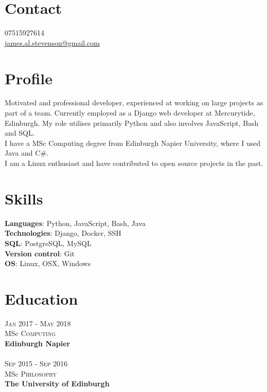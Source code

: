 \documentclass[14pt, a4paper]{extarticle}
\begin{document}
\par{\bigskip\par
\section{Contact}
\large
07515927614\\
\href{mailto:james.al.stevenson@gmail.com}{james.al.stevenson@gmail.com}\\
}

\begin{multicols}{2}

\section{Profile}
\noindent Motivated and professional developer, experienced at working on large projects as part of a team. Currently employed as a Django web developer at Mercurytide, Edinburgh. My role utilises primarily Python and also involves JavaScript, Bash and SQL.\\
I have a MSc Computing degree from Edinburgh Napier University, where I used Java and C\#.\\
I am a Linux enthusiast and have contributed to open source projects in the past.

\section{Skills}
\noindent\textbf{Languages}: Python, JavaScript, Bash, Java\\
\textbf{Technologies}: Django, Docker, SSH\\
\textbf{SQL}: PostgreSQL, MySQL\\
\textbf{Version control}: Git\\
\textbf{OS}: Linux, OSX, Windows

\section{Education}
\noindent\textsc{Jan} 2017 - \textsc{May} 2018\\
MSc \textsc{Computing} \\
\textbf{Edinburgh Napier}\\~\\
\textsc{Sep} 2015 - \textsc{Sep} 2016\\
MSc \textsc{Philosophy} \\ 
\textbf{The University of Edinburgh}


\end{multicols}
\end{document}
